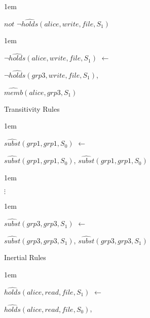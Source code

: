 \documentclass[global,twocolumn,final]{svjour}
\newenvironment{vexample}
  {\begin{example}\hspace{0.25em}}
  {\end{example}}
\newenvironment{vquote}
  {\begin{list}{}{\leftmargin 1em}\item[]}
  {\end{list}}
\begin{document}
\begin{vexample}
\begin{enumerate}
\begin{vquote}
                \hspace{1em}
                $not$ $\lnot\hat{holds}(alice, write, file, S_{1})$
              \end{vquote}

              \begin{vquote}
                $\lnot\hat{holds}(alice, write, file, S_{1})$ $\leftarrow$

                \hspace{1em}
                $\lnot \hat{holds}(grp3, write, file, S_{1})$,

                \hspace{1em}
                $\hat{memb}(alice, grp3, S_{1})$
              \end{vquote}

            \item
              Transitivity Rules

              \begin{vquote}
                $\hat{subst}(grp1, grp1, S_{0})$ $\leftarrow$

                \hspace{1em}
                $\hat{subst}(grp1, grp1, S_{0})$,
                $\hat{subst}(grp1, grp1, S_{0})$
              \end{vquote}

              \begin{vquote}
                \hspace{2em}$\vdots$
              \end{vquote}

              \begin{vquote}
                $\hat{subst}(grp3, grp3, S_{1})$ $\leftarrow$

                \hspace{1em}
                $\hat{subst}(grp3, grp3, S_{1})$,
                $\hat{subst}(grp3, grp3, S_{1})$
              \end{vquote}

            \item
              Inertial Rules

              \begin{vquote}
                $\hat{holds}(alice, read, file, S_{1})$ $\leftarrow$

                \hspace{1em}
                $\hat{holds}(alice, read, file, S_{0})$,


\end{vquote}
\end{enumerate}
\end{vexample}
\end{document}
